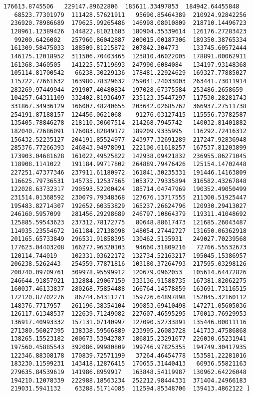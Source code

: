 \documentclass[11pt]{article}
\begin{document}
\begin{Verbatim}[commandchars=\\\{\}]
  176613.8745506   229147.89622806  185611.33497853  184942.64455848
   68523.77301979  111428.57621911   95690.85464389  210924.92842256
  236920.78986689  179625.99265486  146998.08010809  218710.14496723
  128961.12389426  144822.81021683  180904.35339614  126176.27283423
   99200.6426002   257960.86042887  200015.00187306  189350.38765334
  161309.58475033  188509.81215872  207842.304773    133745.60572444
  146175.12018952  311506.70403465  123810.46022005  178891.00062911
  161368.3460505   141225.57119693  247990.6084084   134197.93148368
  105114.81700542   66238.30229136  178481.22924629  169327.77885027
  115722.77661632  163980.78329632  259041.24033003  263441.73011914
  283269.97449944  291907.40480834  197028.67375584  253486.2658659
  104257.64311109  332402.81936497  235123.35447297  117530.28281743
  331867.34936129  166007.48240655  203642.02685762  366937.27511738
  254191.87188157  124456.0621068    91276.03127415  115556.73782587
  135405.78846278  218110.30607514  214268.7945742   140032.81401882
  182040.72686091  176083.82849172  189209.9335995   116292.72416312
  156432.52235127  204191.85524977  243977.32691289  217247.92836948
  285376.77266393  246843.94978091  222100.61618257  167537.81203899
  173903.04681628  161022.49525822  142938.09421832  236955.86271045
  118908.1141022   191184.99717802  264889.79476426  125154.14702448
  227251.47377346  237911.61180972  161841.30235331  191446.14163809
  116625.79736531  145735.12537565  105372.79335894  316582.43267848
  122028.63732317  290593.52200424  185714.04747969  190352.49050499
  231514.01368592  230079.79348368  127676.13717555  211300.51925447
  195483.82714307  192652.60353829  165237.26624796  120930.29413027
  246160.5957099   281456.29298689  246797.10864379  119311.41048692
  125885.59543623  237312.78172775   80648.88617473  121685.26043487
  114935.23554672  161184.27138098  148054.27442727  131650.06362918
  201165.65733849  296531.91858395  130462.5135931   249027.70239568
  177623.04403208  166277.96320103   94660.31809216   72766.55532673
  120114.744019    102331.03622172  132734.52163217  195045.15386957
  206238.5262443   254559.77871816  103180.37264793  217595.03298126
  200740.09709761  309978.95599912  120679.0962053   105614.64472826
  246644.91857921  132884.29067159  333136.91588735  167381.82062275
  160037.46133837  280268.75854488  166764.14578859  163691.73116515
  172120.87702276   86744.64311271  159726.64897898  152045.32160112
  148376.7717957   261196.38354104  190853.69410498  147271.05605036
  126117.61348537  122639.71249082  227607.46595295  170013.76929953
  136917.40993332  157131.07140997  127090.52733891  135446.00011116
  271380.56027395  138338.59566889  233995.26083728  141733.47586868
  138265.15523182  200673.53942787  186815.23291077  226030.65231941
  197560.45885543  392086.99980809  199746.97825355  194749.30417935
  122346.88308178  170839.72571199   37264.46454778  153581.22281016
  183230.11599231  143418.12876415  170655.31440413   60936.55821163
  279635.84539619  141986.8959917   163848.54119987  130962.64226048
  194210.12078339  222988.18563234  252212.98444331  371404.24966183
  219031.5941132    63288.51714085  112594.85348706  139413.4862122 ]


\end{Verbatim}
\end{document}
